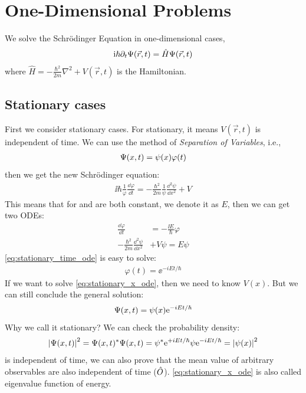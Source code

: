 \chapter{One-Dimensional Problems} \label{chap:1dim}
We solve the Schrödinger Equation in one-dimensional cases,
\begin{eqnarray}
    \mathrm{i} \hbar \partial_t \Psi(\vec{r},t) = \hat{H} \Psi(\vec{r},t) \label{eq:time_dependent_schrodinger}
\end{eqnarray}
where $\hat{H} = - \frac{\hbar^2}{2m} \nabla^2 + V(\vec{r},t)$ is the Hamiltonian. 
\section{Stationary cases}
First we consider stationary cases. For stationary, it means $V(\vec{r},t)$ is independent of time. We can use the method of \emph{Separation of Variables}, i.e., 
\begin{eqnarray}
    \Psi(x,t) = \psi(x)\varphi(t)
\end{eqnarray}
then we get the new Schrödinger equation: 
\begin{eqnarray}
    \ii \hbar \frac{1}{\varphi} \frac{\dd \varphi}{\dd t} = - \frac{\hbar^2}{2m} \frac{1}{\psi} \frac{\dd^2 \psi}{\dd x^2} + V
\end{eqnarray}
This means that for \lhs and \rhs are both constant, we denote it as $E$, then we can get two ODEs: 
\begin{align}
   \frac{\dd \varphi}{\dd t} &= - \frac{\ii E}{\hbar} \varphi \label{eq:stationary_time_ode} \\ 
   - \frac{\hbar^2}{2m} \frac{\dd^2 \psi}{\dd x^2} &+ V \psi = E \psi \label{eq:stationary_x_ode}
\end{align}
\cref{eq:stationary_time_ode} is easy to solve: 
\begin{eqnarray}
    \varphi(t) = \ee^{- i E t/ \hbar} \label{eq:time_factor_Schrödinger}
\end{eqnarray}
If we want to solve \cref{eq:stationary_x_ode}, then we need to know $V(x)$. But we can still conclude the general solution: 
\begin{eqnarray}
    \Psi(x,t) = \psi(x) \mathrm{e}^{- i E t/ \hbar}
\end{eqnarray}
Why we call it stationary? We can check the probability density: 
\begin{eqnarray}
    \left| \Psi(x,t) \right|^2 = \Psi(x,t)^* \Psi(x,t) = \psi^* \mathrm{e}^{+ i E t/ \hbar} \psi \mathrm{e}^{- i E t/ \hbar} = \left| \psi(x) \right|^2
\end{eqnarray}
is independent of time, we can also prove that the mean value of arbitrary observables are also independent of time ($\hat{O}$). \cref{eq:stationary_x_ode} is also called eigenvalue function of energy.

